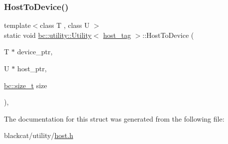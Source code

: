 \subsubsection{\texorpdfstring{Host\+To\+Device()}{HostToDevice()}}
{\footnotesize\ttfamily template$<$class T , class U $>$ \\
static void \hyperlink{structbc_1_1utility_1_1Utility}{bc\+::utility\+::\+Utility}$<$ \hyperlink{structbc_1_1host__tag}{host\+\_\+tag} $>$\+::Host\+To\+Device (\begin{DoxyParamCaption}\item[{T $\ast$}]{device\+\_\+ptr,  }\item[{U $\ast$}]{host\+\_\+ptr,  }\item[{\hyperlink{namespacebc_aaf8e3fbf99b04b1b57c4f80c6f55d3c5}{bc\+::size\+\_\+t}}]{size }\end{DoxyParamCaption})\hspace{0.3cm}{\ttfamily [inline]}, {\ttfamily [static]}}



The documentation for this struct was generated from the following file\+:\begin{DoxyCompactItemize}
\item 
blackcat/utility/\hyperlink{utility_2host_8h}{host.\+h}\end{DoxyCompactItemize}
